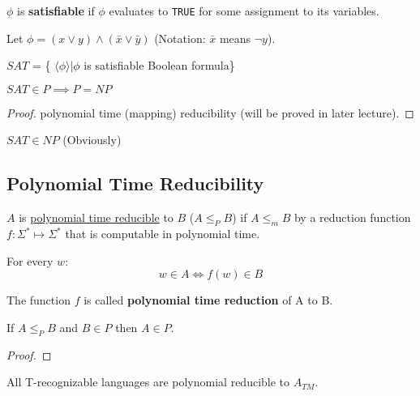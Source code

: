 \begin{definition}
    \(\phi\) is \textbf{satisfiable} if \(\phi\) evaluates to \verb|TRUE| for some assignment to its variables. 
\end{definition}

\begin{example}
    Let \(\phi = (x \lor y) \land (\bar{x} \lor \bar{y})\) (Notation: \(\bar{x}\) means \(\neg y\)). 
\end{example}

\begin{definition}
    \(SAT\) = \{ \(\langle \phi \rangle | \phi\) is satisfiable Boolean formula\} 
\end{definition}

\begin{definition}
    \(SAT \in P \implies P = NP\)  
\end{definition}
\begin{proof}
    polynomial time (mapping) reducibility (will be proved in later lecture). 
\end{proof}

\begin{remark}
        \(SAT \in NP\) (Obviously)
\end{remark}

\subsection{Polynomial Time Reducibility}
\begin{definition}
    \(A\) is \underline{polynomial time reducible} to \(B\) (\(A \leq_P B\))  if \(A \leq_m B\) by a reduction function \(f: \Sigma^* \mapsto \Sigma^*\) that is computable in polynomial time.

    For every \(w\):
    \[
        w \in A \iff f(w) \in B
    \]

    The function \(f\) is called \textbf{polynomial time reduction} of A to B.
\end{definition}
\begin{theorem}
    If \( A \leq_P B\) and \(B \in P\) then \(A \in P\). 
\end{theorem}
\begin{proof}
    
\end{proof}

\begin{note}
    All T-recognizable languages are polynomial reducible to \(A_{TM}\).   
\end{note}
